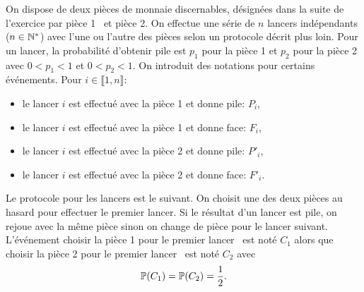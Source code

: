 On dispose de deux pièces de monnaie discernables, désignées dans la suite de l'exercice par \og pièce 1\fg~ et \og pièce 2\fg. On effectue une série de $n$ lancers indépendants ($n\in \N^*$) avec l'une ou l'autre des pièces selon un protocole décrit plus loin.\newline
Pour un lancer, la probabilité d'obtenir pile est $p_1$ pour la pièce 1 et $p_2$ pour la pièce 2 avec $0<p_1<1$ et $0<p_2<1$.\newline
On introduit des notations pour certains événements. Pour $i\in \llbracket 1,n \rrbracket$:
\begin{itemize}
 \item \og le lancer $i$ est effectué avec la pièce 1 et donne pile\fg: $P_i$,
 \item \og le lancer $i$ est effectué avec la pièce 1 et donne face\fg: $F_i$,
 \item \og le lancer $i$ est effectué avec la pièce 2 et donne pile\fg: $P'_i$,
 \item \og le lancer $i$ est effectué avec la pièce 2 et donne face\fg: $F'_i$.
\end{itemize}
Le protocole pour les lancers est le suivant. On choisit une des deux pièces au hasard pour effectuer le premier lancer. Si le résultat d'un lancer est pile, on rejoue avec la même pièce sinon on change de pièce pour le lancer suivant.\newline
L'événement \og choisir la pièce 1 pour le premier lancer\fg~ est noté $C_1$ alors que \og choisir la pièce 2 pour le premier lancer\fg~ est noté $C_2$ avec
\[
 \P(C_1) = \P(C_2) = \frac{1}{2}.
\]
